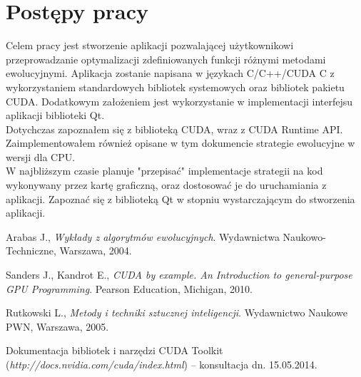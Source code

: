 \documentclass[12pt,a4paper]{article}
\begin{document}
\section{Postępy pracy}
\indent Celem pracy jest stworzenie aplikacji pozwalającej użytkownikowi przeprowadzanie optymalizacji zdefiniowanych funkcji różnymi metodami ewolucyjnymi. Aplikacja zostanie napisana w językach C/C++/CUDA C z wykorzystaniem standardowych bibliotek systemowych oraz bibliotek pakietu CUDA. Dodatkowym założeniem jest wykorzystanie w implementacji interfejsu aplikacji biblioteki Qt.\\
\indent Dotychczas zapoznałem się z biblioteką CUDA, wraz z CUDA Runtime API. Zaimplementowałem również opisane w tym dokumencie strategie ewolucyjne w wersji dla CPU.\\
\indent W najbliższym czasie planuje "przepisać" implementacje strategii na kod wykonywany przez kartę graficzną, oraz dostosować je do uruchamiania z aplikacji. Zapoznać się z biblioteką Qt w stopniu wystarczającym do stworzenia aplikacji. 
\begin{thebibliography}{9}

	Arabas J.,
	\emph{Wykłady z algorytmów ewolucyjnych}.
	Wydawnictwa Naukowo-Techniczne, 
	Warszawa,
	2004.

	Sanders J., Kandrot E., 
	\emph{CUDA by example. An Introduction to general-purpose GPU Programming}.
	Pearson Education, Michigan, 
	2010.

	Rutkowski L.,
	\emph{Metody i techniki sztucznej inteligencji}.
	Wydawnictwo Naukowe PWN, 
	Warszawa,
	2005.

	Dokumentacja bibliotek i narzędzi CUDA Toolkit 
	(\emph{http://docs.nvidia.com/cuda/index.html}) – konsultacja dn. 15.05.2014.

\end{thebibliography}
\end{document}
